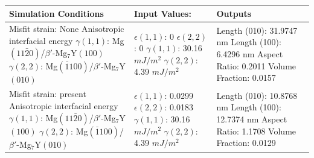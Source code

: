 \documentclass[11pt]{article}
\begin{document}
\begin{table}[htbp]
    \centering
    \renewcommand{\arraystretch}{1.5}
    \begin{tabularx}{\textwidth}{
        |>{\hsize=1.2\hsize}X    %
        |>{\hsize=0.8\hsize}X    %
        |>{\hsize=1.0\hsize}X|   %
    }
        \hline
        \textbf{Simulation Conditions}
        & \textbf{Input Values:}
        & \textbf{Outputs} \\
        \hline

        Misfit strain: None \newline
        Anisotropic interfacial energy\newline
        $\gamma(1,1)$: Mg$(11\bar{2}0)$/$\beta'$-Mg$_7$Y$(100)$ \newline
        $\gamma(2,2)$: Mg$(\bar{1}100)$/$\beta'$-Mg$_7$Y$(010)$
        &
        $\epsilon(1,1)$: 0 \newline
        $\epsilon(2,2)$: 0\newline
        $\gamma(1,1)$: 30.16 $mJ/m^2$  \newline
        $\gamma(2,2)$: 4.39 $mJ/m^2$
        &
        Length (010): 31.9747 nm      \newline
        Length (100): 6.4296 nm      \newline
        Aspect Ratio: 0.2011   \newline
        Volume Fraction: 0.0157
        \\
        \hline

        Misfit strain: present \newline
        Anisotropic interfacial energy\newline
        $\gamma(1,1)$: Mg$(11\bar{2}0)$/$\beta'$-Mg$_7$Y$(100)$ \newline
        $\gamma(2,2)$: Mg$(\bar{1}100)$/$\beta'$-Mg$_7$Y$(010)$
        &
        $\epsilon(1,1)$: 0.0299\newline
        $\epsilon(2,2)$: 0.0183\newline
        $\gamma(1,1)$: 30.16 $mJ/m^2$  \newline
        $\gamma(2,2)$: 4.39 $mJ/m^2$
        &
        Length (010): 10.8768 nm      \newline
        Length (100): 12.7374 nm      \newline
        Aspect Ratio: 1.1708   \newline
        Volume Fraction: 0.0129
        \\
        \hline


\end{tabularx}
\end{table}
\end{document}
